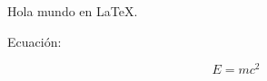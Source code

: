 \documentclass{article}
\begin{document}
Hola mundo en LaTeX.

Ecuación:

\[
E = mc^2
\]
\end{document}
